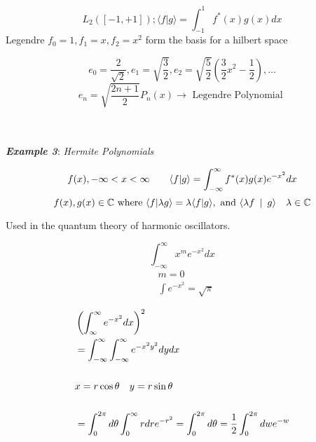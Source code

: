 \documentclass[svgnames]{article}   	%
\begin{document}
\begin{tcolorbox}[colback = red!5!white, colframe = red!50!black, title
  = Legendre Polynomials]
  
  \[
    L_2([-1, +1]); \langle f | g \rangle = \int_{-1}^1 f^\ast (x) g(x) dx
  \]
  Legendre \hspace{10px} $f_0 = 1, f_1 = x, f_2 = x^2$ form the basis for
  a hilbert space 

  \[
    e_0 = \frac{2}{\sqrt{2}}, e_1 = \sqrt{\frac{3}{2}}, e_2
    = \sqrt{\frac{5}{2}}\left( \frac{3}{2}x^2 - \frac{1}{2} \right), \dots 
  \]
  \[
    e_n = \sqrt{\frac{2n+1}{2}}P_n(x) \rightarrow \text{ Legendre Polynomial } 
  \]
\end{tcolorbox}
\mbox{} \\\\

\textit{ \textbf{Example 3}}: \textit{Hermite Polynomials}

\[
f(x), -\infty < x < \infty \hspace{10px} \hspace{10px} \langle f | g \rangle
= \int_{-\infty}^{\infty} f^\ast (x) g(x) e^{-x^2} dx
\]
\[
  f(x), g(x) \in \mathbb{C} \text{ where } \langle f | \lambda g \rangle
  = \lambda \langle f | g \rangle, \text{ and } \langle \lambda f \hspace{5px}
  | \hspace{5px} g \rangle  \hspace{10px} \lambda \in \mathbb{C}
\] \vspace{5px}


\begin{tcolorbox}[colback = blue!5!white, colframe = blue!50!black, title
  = Gaussian Integrals]
  
  Used in the quantum theory of harmonic oscillators. 

  \[
    \int_{-\infty}^{\infty} x^m e^{-x^2} dx
  \]
  \begin{align*}
    &m = 0 \\
    &\int e^{-x^2} = \sqrt{\pi}
  \end{align*}
  
\end{tcolorbox}

\begin{tcolorbox}[colback = red!5!white, colframe = red!50!black, title
  = Solving Gaussian Integrals]
  
  \begin{align*}
    &\left( \int_{\infty}^{\infty} e^{-x^2} dx \right)^2 \\
    &= \int_{-\infty}^{\infty} \int_{-\infty}^{\infty} e^{-x^2y^2} dydx \\\\
    &x = r\cos\theta \hspace{10px}
    y = r\sin\theta \\\\
    &= \int_0^{2\pi} d\theta \int_0^{\infty} rdr e^{-r^2} = \int_0^{2\pi}
    d\theta = \frac{1}{2} \int_0^{2\pi} dw e^{-w}
  \end{align*}

\end{tcolorbox}
\end{document}
